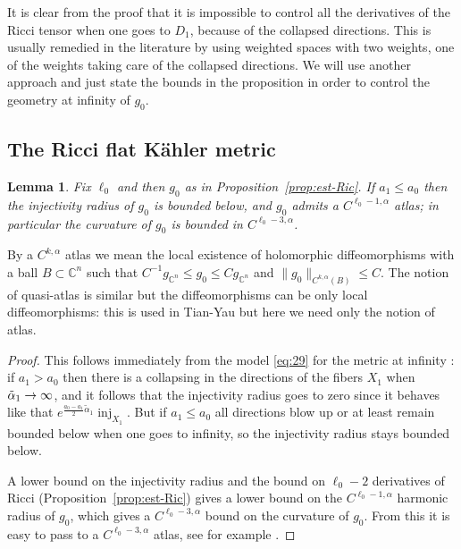 \documentclass[10pt]{amsart}
\theoremstyle{plain}
\newtheorem{lem}[thm]{Lemma}
\theoremstyle{definition}
\DeclareMathOperator{\inj}{inj}
\newcommand{\ta}{\tilde \alpha}
\let\Subsection\subsection\let\Subsubsection\subsubsection
\begin{document}
It is clear from the proof that it is impossible to control all the derivatives of the Ricci tensor when one goes to $D_1$, because of the collapsed directions. This is usually remedied in the literature by using weighted spaces with two weights, one of the weights taking care of the collapsed directions. We will use another approach and just state the bounds in the proposition in order to control the geometry at infinity of $g_0$.

\Subsection{The Ricci flat Kähler metric}

\begin{lem}\label{lem:atlas}
Fix $\ell_0$ and then $g_0$ as in Proposition~\ref{prop:est-Ric}. If $a_1\leq a_0$ then the injectivity radius of $g_0$ is bounded below, and $g_0$ admits a $C^{\ell_0-1,\alpha}$ atlas; in particular the curvature of $g_0$ is bounded in $C^{\ell_0-3,\alpha}$.
\end{lem}
By a $C^{k,\alpha}$ atlas we mean the local existence of holomorphic diffeomorphisms with a ball $B\subset \mathbb{C}^n$ such that $C^{-1}g_{\mathbb{C}^n} \leq g_0 \leq C g_{\mathbb{C}^n}$ and $\|g_0\|_{C^{k,\alpha}(B)} \leq C$. The notion of quasi-atlas is similar but the diffeomorphisms can be only local diffeomorphisms: this is used in Tian-Yau \cite{TiaYau90} but here we need only the notion of atlas.
\begin{proof}
This follows immediately from the model \eqref{eq:29} for the metric at infinity : if $a_1>a_0$ then there is a collapsing in the directions of the fibers $X_1$ when $\ta_1\to\nobreak\infty$, and it follows that the injectivity radius goes to zero since it behaves like that $e^{\frac{a_0-a_1}2\ta_1}\inj_{X_1}$. But if $a_1\leq a_0$ all directions blow up or at least remain bounded below when one goes to infinity, so the injectivity radius stays bounded below.

A lower bound on the injectivity radius and the bound on $\ell_0-2$ derivatives of Ricci (Proposition~\ref{prop:est-Ric}) gives a lower bound on the $C^{\ell_0-1,\alpha}$ harmonic radius of $g_0$, which gives a $C^{\ell_0-3,\alpha}$ bound on the curvature of $g_0$. From this it is easy to pass to a $C^{\ell_0-3,\alpha}$ atlas, see for example \cite{TiaYau90}.
\end{proof}
\end{document}
